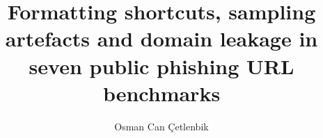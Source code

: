 \documentclass[preprint,12pt,authoryear]{elsarticle}
\begin{document}
\begin{frontmatter}

\title{Formatting shortcuts, sampling artefacts and domain leakage in seven public phishing URL benchmarks}

\author{Osman Can \c{C}etlenbik}
\address{Big Data Analytics Program, Department of Statistics, Manisa Technical Sciences Vocational School, Manisa Celal Bayar University, Manisa 45140, T\"urkiye}



\end{frontmatter}








\FloatBarrier


\end{document}
